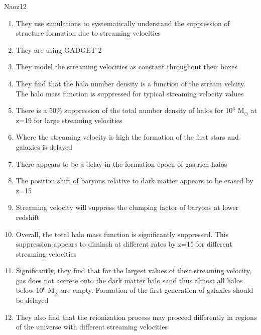\documentclass[a4paper,fleqn,usenatbib]{mnras}
\begin{document}
\li Naoz12
\begin{enumerate}
	\item They use simulations to systematically understand the suppression of structure formation due to streaming velocities
	\item They are using GADGET-2
	\item They model the streaming velocities as constant throughout their boxes
	\item They find that the halo number density is a function of the stream velcity. The halo mass function is suppressed for typical streaming velocity values
	\item There is a 50\% suppression of the total number density of halos for 10$^{6}$ M$_{\odot}$ at z=19 for large streaming velocities
	\item Where the streaming velocity is high the formation of the first stars and galaxies is delayed
	\item There appears to be a delay in the formation epoch of gas rich halos
	\item The position shift of baryons relative to dark matter appears to be erased by z=15
	\item Streaming velocity will suppress the clumping factor of baryons at lower redshift 
	\item Overall, the total halo mass function is significantly suppressed. This suppression appears to diminsh at different rates by z=15 for different streaming velocities
	\item Significantly, they find that for the largest values of their streaming velocity, gas does not accrete onto the dark matter halo sand thus almost all halos below 10$^{6}$ M$_{\odot}$ are empty. Formation of the first generation of galaxies should be delayed
	\item They also find that the reionization process may proceed differently in regions of the universe with different streaming velocities
\end{enumerate}
\end{document}
